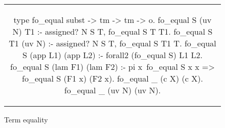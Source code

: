 \setlength{\abovecaptionskip}{0pt plus 3pt minus 2pt}

    



      
  



\begin{figure*}
  \begin{tabular}{c}
    \begin{minipage}{.80\textwidth}
      \begin{elpicode}
        type fo_equal subst -> tm -> tm -> o.
        fo_equal S (uv N) T1 :- assigned? N S T, fo_equal S T T1.
        fo_equal S T1 (uv N) :- assigned? N S T, fo_equal S T1 T.
        fo_equal S (app L1) (app L2) :- forall2 (fo_equal S) L1 L2.
        fo_equal S (lam F1) (lam F2) :- pi x\ fo_equal S x x => fo_equal S (F1 x) (F2 x).
        fo_equal _ (c X) (c X).
        fo_equal _ (uv N) (uv N).
      \end{elpicode}
    \end{minipage}
  \end{tabular}
  \caption{Term equality}
  \label{code:term-equal}
\end{figure*}

